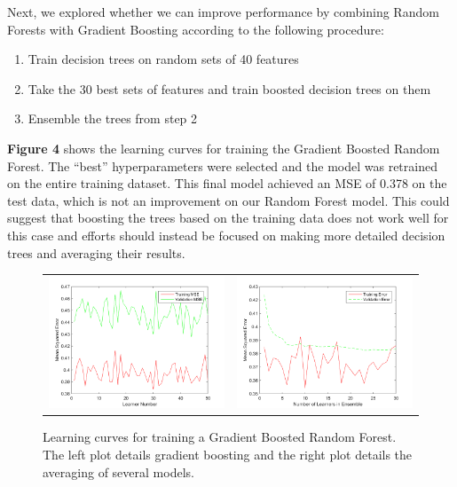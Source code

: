 \documentclass[12pt] {article}
\renewcommand{\baselinestretch}{1.2} %
\begin{document}
Next, we explored whether we can improve performance by combining Random Forests with Gradient Boosting according to the following procedure:
\begin{enumerate}
\item Train decision trees on random sets of 40 features
\item Take the 30 best sets of features and train boosted decision trees on them
\item Ensemble the trees from step 2
\end{enumerate}

\textbf{Figure 4} shows the learning curves for training the Gradient Boosted Random Forest. The ``best'' hyperparameters were selected and the model was retrained on the entire training dataset. This final model achieved an MSE of 0.378 on the test data, which is not an improvement on our Random Forest model. This could suggest that boosting the trees based on the training data does not work well for this case and efforts should instead be focused on making more detailed decision trees and averaging their results. 

\renewcommand{\baselinestretch}{1.0} %
\begin{figure}[h!] \centering
\begin{tabular}{cc}
\includegraphics[width=.45\textwidth]{figdir/learnerNumVersusMSE.png} &
\includegraphics[width=.45\textwidth]{figdir/numLearnersVersusMSE2.png} \\
\end{tabular}
\caption{Learning curves for training a Gradient Boosted Random Forest. The left plot details gradient boosting and the right plot details the averaging of several models.}
\end{figure}
\renewcommand{\baselinestretch}{1.2} %
\end{document}
